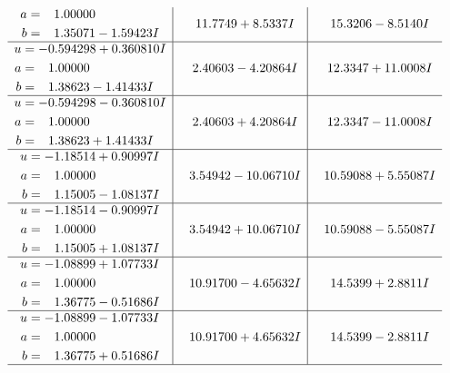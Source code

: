 \documentclass[1p]{elsarticle_modified}
\theoremstyle{definition}
\begin{document}
$$\begin{array}{c|c|c}
\begin{aligned}
a &= \phantom{-}1.00000\phantom{ +0.000000I} \\
b &= \phantom{-}1.35071 - 1.59423 I\end{aligned}
 & \phantom{-}11.7749 + 8.5337 I & \phantom{-}15.3206 - 8.5140 I \\ \hline\begin{aligned}
u &= -0.594298 + 0.360810 I \\
a &= \phantom{-}1.00000\phantom{ +0.000000I} \\
b &= \phantom{-}1.38623 - 1.41433 I\end{aligned}
 & \phantom{-}2.40603 - 4.20864 I & \phantom{-}12.3347 + 11.0008 I \\ \hline\begin{aligned}
u &= -0.594298 - 0.360810 I \\
a &= \phantom{-}1.00000\phantom{ +0.000000I} \\
b &= \phantom{-}1.38623 + 1.41433 I\end{aligned}
 & \phantom{-}2.40603 + 4.20864 I & \phantom{-}12.3347 - 11.0008 I \\ \hline\begin{aligned}
u &= -1.18514 + 0.90997 I \\
a &= \phantom{-}1.00000\phantom{ +0.000000I} \\
b &= \phantom{-}1.15005 - 1.08137 I\end{aligned}
 & \phantom{-}3.54942 - 10.06710 I & \phantom{-}10.59088 + 5.55087 I \\ \hline\begin{aligned}
u &= -1.18514 - 0.90997 I \\
a &= \phantom{-}1.00000\phantom{ +0.000000I} \\
b &= \phantom{-}1.15005 + 1.08137 I\end{aligned}
 & \phantom{-}3.54942 + 10.06710 I & \phantom{-}10.59088 - 5.55087 I \\ \hline\begin{aligned}
u &= -1.08899 + 1.07733 I \\
a &= \phantom{-}1.00000\phantom{ +0.000000I} \\
b &= \phantom{-}1.36775 - 0.51686 I\end{aligned}
 & \phantom{-}10.91700 - 4.65632 I & \phantom{-}14.5399 + 2.8811 I \\ \hline\begin{aligned}
u &= -1.08899 - 1.07733 I \\
a &= \phantom{-}1.00000\phantom{ +0.000000I} \\
b &= \phantom{-}1.36775 + 0.51686 I\end{aligned}
 & \phantom{-}10.91700 + 4.65632 I & \phantom{-}14.5399 - 2.8811 I\\
 \hline 
 \end{array}$$\newpage\newpage\renewcommand{\arraystretch}{1}
\end{document}
